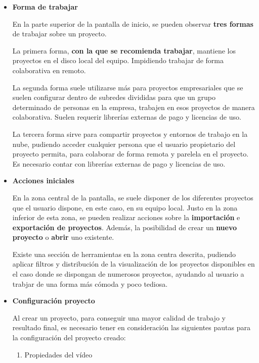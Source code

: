\begin{itemize}
    \item \textbf{Forma de trabajar}
    
    En la parte superior de la pantalla de inicio, se pueden observar \textbf{tres formas} 
    de trabajar sobre un proyecto.

    La primera forma, \textbf{con la que se recomienda trabajar}, mantiene los proyectos en 
    el disco local del equipo. Impidiendo trabajar de forma colaborativa en remoto.

    La segunda forma suele utilizarse más para proyectos empresariales que se suelen configurar 
    dentro de subredes divididas para que un grupo determinado de personas en la empresa, trabajen 
    en esos proyectos de manera colaborativa. Suelen requerir librerías externas de pago y 
    licencias de uso.
    
    La tercera forma sirve para compartir proyectos y entornos de trabajo en la nube, pudiendo 
    acceder cualquier persona que el usuario propietario del proyecto permita, para colaborar 
    de forma remota y parelela en el proyecto. Es necesario contar con librerías externas 
    de pago y licencias de uso.

    \item \textbf{Acciones iniciales}
    
    En la zona central de la pantalla, se suele disponer de los diferentes proyectos que 
    el usuario dispone, en este caso, en su equipo local. Justo en la zona inferior de esta 
    zona, se pueden realizar acciones sobre la \textbf{importación} e 
    \textbf{exportación de proyectos}. Además, la posibilidad de crear un \textbf{nuevo proyecto} o 
    \textbf{abrir} uno existente. 

    Existe una sección de herramientas en la zona centra descrita, pudiendo aplicar filtros 
    y distribución de la visualización de los proyectos disponibles en el caso donde se 
    dispongan de numerosos proyectos, ayudando al usuario a trabjar de una forma más cómoda 
    y poco tediosa.

    \item \textbf{Configuración proyecto}
    
    Al crear un proyecto, para conseguir una mayor calidad de trabajo y resultado final, es 
    necesario tener en consideración las siguientes pautas para la configuración del proyecto 
    creado:

    \begin{enumerate}[label=\arabic*.]
        \item Propiedades del vídeo
        

\end{enumerate}
\end{itemize}
